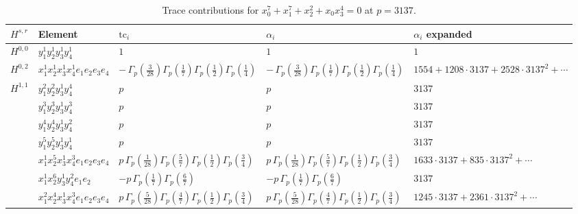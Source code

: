 \documentclass[11pt]{article}
\begin{document}
\begin{table}[ht]
\centering
\caption{Trace contributions for $x_0^{7} + x_1^{7} + x_2^{2} + x_0 x_3^{4} = 0$ at $p=3137$.}\label{tab:deformed-36}
\renewcommand{\arraystretch}{1.1}
{\scriptsize
\begin{tabular}{@{}lllll@{}}
\toprule
$H^{s,r}$ & Element & $\mathrm{tc}_i$ & $\alpha_i$ & $\alpha_i$ expanded \\
\midrule
$H^{0,0}$ & $y_{1}^{1} y_{2}^{1} y_{3}^{1} y_{4}^{1}$ & $1$ & $1$ & $1$ \\
\midrule
$H^{0,2}$ & $x_{1}^{1} x_{2}^{1} x_{3}^{1} x_{4}^{1}  e_{1} e_{2} e_{3} e_{4}$ & $- \, \Gamma_p \left( \frac{3}{28} \right) \Gamma_p \left( \frac{1}{7} \right) \Gamma_p \left( \frac{1}{2} \right) \Gamma_p \left( \frac{1}{4} \right)$ & $- \, \Gamma_p \left( \frac{3}{28} \right) \Gamma_p \left( \frac{1}{7} \right) \Gamma_p \left( \frac{1}{2} \right) \Gamma_p \left( \frac{1}{4} \right)$ & $1554{+}1208{\cdot}3137{+}2528{\cdot}3137^{2}{+}\cdots$ \\
\midrule
$H^{1,1}$ & $y_{1}^{2} y_{2}^{2} y_{3}^{1} y_{4}^{4}$ & $p \,$ & $p \,$ & $3137$ \\
 & $y_{1}^{3} y_{2}^{3} y_{3}^{1} y_{4}^{3}$ & $p \,$ & $p \,$ & $3137$ \\
 & $y_{1}^{4} y_{2}^{4} y_{3}^{1} y_{4}^{2}$ & $p \,$ & $p \,$ & $3137$ \\
 & $y_{1}^{5} y_{2}^{5} y_{3}^{1} y_{4}^{1}$ & $p \,$ & $p \,$ & $3137$ \\
 & $x_{1}^{1} x_{2}^{5} x_{3}^{1} x_{4}^{3}  e_{1} e_{2} e_{3} e_{4}$ & $p \, \Gamma_p \left( \frac{1}{28} \right) \Gamma_p \left( \frac{5}{7} \right) \Gamma_p \left( \frac{1}{2} \right) \Gamma_p \left( \frac{3}{4} \right)$ & $p \, \Gamma_p \left( \frac{1}{28} \right) \Gamma_p \left( \frac{5}{7} \right) \Gamma_p \left( \frac{1}{2} \right) \Gamma_p \left( \frac{3}{4} \right)$ & $1633{\cdot}3137{+}835{\cdot}3137^{2}{+}\cdots$ \\
 & $x_{1}^{1} x_{2}^{6} y_{3}^{1} y_{4}^{2} e_{1} e_{2}$ & $- p \, \Gamma_p \left( \frac{1}{7} \right) \Gamma_p \left( \frac{6}{7} \right)$ & $- p \, \Gamma_p \left( \frac{1}{7} \right) \Gamma_p \left( \frac{6}{7} \right)$ & $3137$ \\
 & $x_{1}^{2} x_{2}^{4} x_{3}^{1} x_{4}^{3}  e_{1} e_{2} e_{3} e_{4}$ & $p \, \Gamma_p \left( \frac{5}{28} \right) \Gamma_p \left( \frac{4}{7} \right) \Gamma_p \left( \frac{1}{2} \right) \Gamma_p \left( \frac{3}{4} \right)$ & $p \, \Gamma_p \left( \frac{5}{28} \right) \Gamma_p \left( \frac{4}{7} \right) \Gamma_p \left( \frac{1}{2} \right) \Gamma_p \left( \frac{3}{4} \right)$ & $1245{\cdot}3137{+}2361{\cdot}3137^{2}{+}\cdots$ \\

\end{tabular}}
\end{table}
\end{document}
